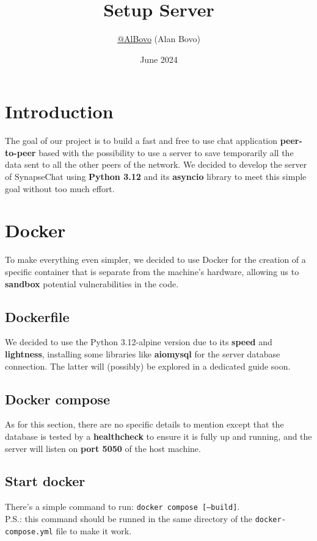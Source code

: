 \documentclass{article}
\title{\textbf{Setup Server}}
\author{\href{https://github.com/AlBovo/}{@AlBovo} (Alan Bovo)}
\date{June 2024}
\begin{document}
\maketitle

\section{Introduction}
The goal of our project is to build a fast and free to use chat application \textbf{peer-to-peer} based with the
possibility to use a server to save temporarily all the data sent to all the other peers of the network.
We decided to develop the server of SynapseChat using \textbf{Python 3.12} and its \textbf{asyncio} library to meet this simple goal
without too much effort. \\

\section{Docker}
To make everything even simpler, we decided to use Docker for the creation of a specific container that is separate from the machine's hardware, allowing us to \textbf{sandbox} potential vulnerabilities in the code.

\subsection{Dockerfile}
We decided to use the Python 3.12-alpine version due to its \textbf{speed} and \textbf{lightness}, installing some libraries like \textbf{aiomysql} for the server database connection. The latter will (possibly) be explored in a dedicated guide soon.

\subsection{Docker compose}
As for this section, there are no specific details to mention except that the database is tested by a \textbf{healthcheck} to ensure it is fully up and running, and the server will listen on \textbf{port 5050} of the host machine.

\subsection{Start docker}
There's a simple command to run: \texttt{docker compose [--build]}.\\
P.S.: this command should be runned in the same directory of the \texttt{docker-compose.yml} file to make it work.
\end{document}
